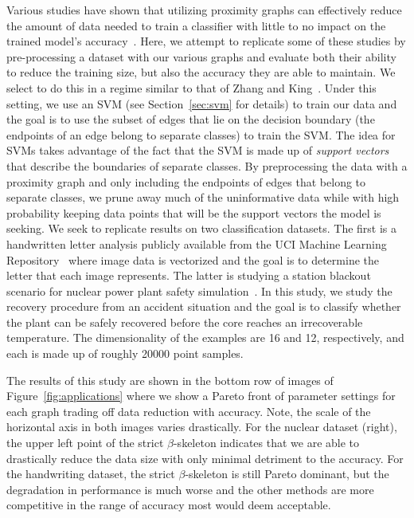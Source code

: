 Various studies have shown that utilizing proximity graphs can effectively reduce the amount of data needed to train a classifier with little to no impact on the trained model's accuracy~\cite{BhattacharyaPoulsenToussaint1981GotoIshidaUchida2015,Toussaint2005,ToussaintBerzan2012,ZhangKing2002a,ZhangKing2002b}.
%
Here, we attempt to replicate some of these studies by pre-processing a dataset with our various graphs and evaluate both their ability to reduce the training size, but also the accuracy they are able to maintain.
%
We select to do this in a regime similar to that of Zhang and King~\cite{ZhangKing2002a,ZhangKing2002b}.
%
Under this setting, we use an SVM (see Section~\ref{sec:svm} for details) to train our data and the goal is to use the subset of edges that lie on the decision boundary (the endpoints of an edge belong to separate classes) to train the SVM.
%
The idea for SVMs takes advantage of the fact that the SVM is made up of \textit{support vectors} that describe the boundaries of separate classes.
%
By preprocessing the data with a proximity graph and only including the endpoints of edges that belong to separate classes, we prune away much of the uninformative data while with high probability keeping data points that will be the support vectors the model is seeking.
%
We seek to replicate results on two classification datasets.
%
The first is a handwritten letter analysis publicly available from the UCI Machine Learning Repository~\cite{DuaGraff2017} where image data is vectorized and the goal is to determine the letter that each image represents.
%
The latter is studying a station blackout scenario for nuclear power plant safety simulation~\cite{MaljovecLiuWang2015}.
%
In this study, we study the recovery procedure from an accident situation and the goal is to classify whether the plant can be safely recovered before the core reaches an irrecoverable temperature.
%
The dimensionality of the examples are 16 and 12, respectively, and each is made up of roughly 20000 point samples.

The results of this study are shown in the bottom row of images of Figure~\ref{fig:applications} where we show a Pareto front of parameter settings for each graph trading off data reduction with accuracy.
%
Note, the scale of the horizontal axis in both images varies drastically.
%
For the nuclear dataset (right), the upper left point of the strict $\beta$-skeleton indicates that we are able to drastically reduce the data size with only minimal detriment to the accuracy.
%
For the handwriting dataset, the strict $\beta$-skeleton is still Pareto dominant, but the degradation in performance is much worse and the other methods are more competitive in the range of accuracy most would deem acceptable.

